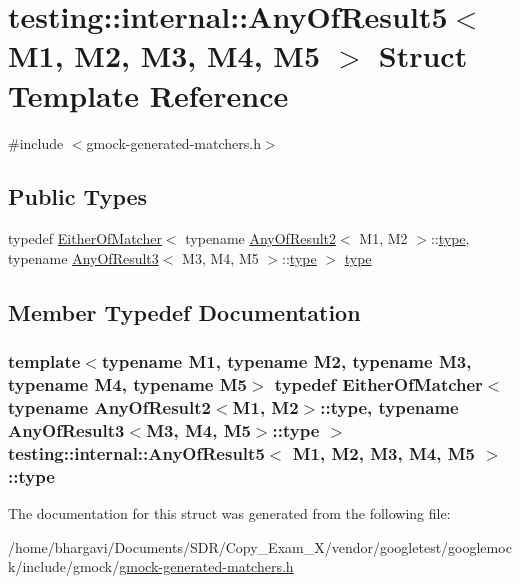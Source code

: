 \hypertarget{structtesting_1_1internal_1_1_any_of_result5}{}\section{testing\+:\+:internal\+:\+:Any\+Of\+Result5$<$ M1, M2, M3, M4, M5 $>$ Struct Template Reference}
\label{structtesting_1_1internal_1_1_any_of_result5}


{\ttfamily \#include $<$gmock-\/generated-\/matchers.\+h$>$}

\subsection*{Public Types}
\begin{DoxyCompactItemize}
\item 
typedef \hyperlink{classtesting_1_1internal_1_1_either_of_matcher}{Either\+Of\+Matcher}$<$ typename \hyperlink{structtesting_1_1internal_1_1_any_of_result2}{Any\+Of\+Result2}$<$ M1, M2 $>$\+::\hyperlink{structtesting_1_1internal_1_1_any_of_result5_a459a06dc5791313dce942668714f0c99}{type}, typename \hyperlink{structtesting_1_1internal_1_1_any_of_result3}{Any\+Of\+Result3}$<$ M3, M4, M5 $>$\+::\hyperlink{structtesting_1_1internal_1_1_any_of_result5_a459a06dc5791313dce942668714f0c99}{type} $>$ \hyperlink{structtesting_1_1internal_1_1_any_of_result5_a459a06dc5791313dce942668714f0c99}{type}
\end{DoxyCompactItemize}


\subsection{Member Typedef Documentation}
\subsubsection[{\texorpdfstring{type}{type}}]{\setlength{\rightskip}{0pt plus 5cm}template$<$typename M1, typename M2, typename M3, typename M4, typename M5$>$ typedef {\bf Either\+Of\+Matcher}$<$ typename {\bf Any\+Of\+Result2}$<$M1, M2$>$\+::{\bf type}, typename {\bf Any\+Of\+Result3}$<$M3, M4, M5$>$\+::{\bf type} $>$ {\bf testing\+::internal\+::\+Any\+Of\+Result5}$<$ M1, M2, M3, M4, M5 $>$\+::{\bf type}}\hypertarget{structtesting_1_1internal_1_1_any_of_result5_a459a06dc5791313dce942668714f0c99}{}\label{structtesting_1_1internal_1_1_any_of_result5_a459a06dc5791313dce942668714f0c99}


The documentation for this struct was generated from the following file\+:\begin{DoxyCompactItemize}
\item 
/home/bhargavi/\+Documents/\+S\+D\+R/\+Copy\+\_\+\+Exam\+\_\+X/vendor/googletest/googlemock/include/gmock/\hyperlink{gmock-generated-matchers_8h}{gmock-\/generated-\/matchers.\+h}\end{DoxyCompactItemize}
